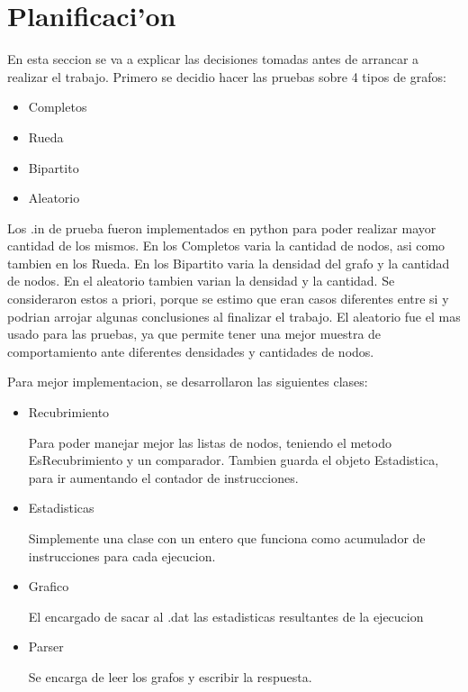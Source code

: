 \section{Planificaci'on}
En esta seccion se va a explicar las decisiones tomadas antes de arrancar a realizar el trabajo.
Primero se decidio hacer las pruebas sobre 4 tipos de grafos:

\begin{itemize}
\item Completos
\item Rueda
\item Bipartito
\item Aleatorio

\end{itemize}

Los .in de prueba fueron implementados en python para poder realizar mayor cantidad de los mismos. En los Completos varia la cantidad de nodos, asi como tambien en los Rueda. En los Bipartito varia la densidad del grafo y la cantidad de nodos. En el aleatorio tambien varian la densidad y la cantidad.
Se consideraron estos a priori, porque se estimo que eran casos diferentes entre si y podrian arrojar algunas conclusiones al finalizar el trabajo.
El aleatorio fue el mas usado para las pruebas, ya que permite tener una mejor muestra de comportamiento ante diferentes densidades y cantidades de nodos.

Para mejor implementacion, se desarrollaron las siguientes clases:

\begin{itemize}
\item Recubrimiento

Para poder manejar mejor las listas de nodos, teniendo el metodo EsRecubrimiento y un comparador. Tambien guarda el objeto Estadistica, para ir aumentando el contador de instrucciones.

\item Estadisticas

Simplemente una clase con un entero que funciona como acumulador de instrucciones para cada ejecucion.

\item Grafico

El encargado de sacar al .dat las estadisticas resultantes de la ejecucion

\item Parser

Se encarga de leer los grafos y escribir la respuesta.

\end{itemize}
